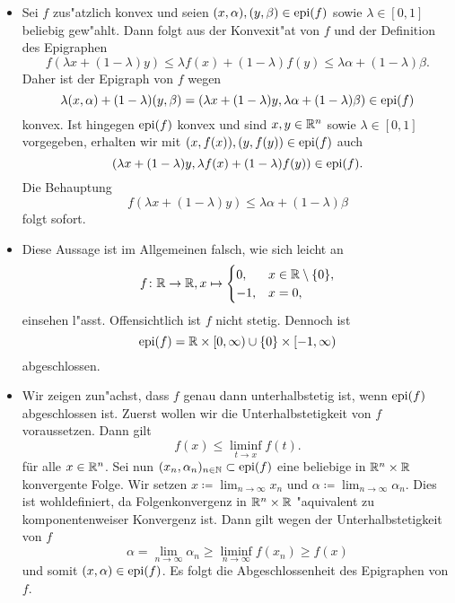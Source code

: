 \begin{itemize}
 \item[(i)] Sei $f$ zus"atzlich konvex und seien $(x,\alpha),(y,\beta)\in\operatorname{epi}(f)$ sowie $\lambda\in[0,1]$ beliebig gew"ahlt.
 Dann folgt aus der Konvexit"at von $f$ und der Definition des Epigraphen
 \begin{displaymath}
  f(\lambda x+(1-\lambda)y)\leq \lambda f(x)+(1-\lambda)f(y)\leq \lambda\alpha+(1-\lambda)\beta.
 \end{displaymath}
 Daher ist der Epigraph von $f$ wegen
 \[
\lambda(x,\alpha)+(1-\lambda)(y,\beta)=
(\lambda x+(1-\lambda)y,\lambda\alpha+(1-\lambda)\beta)\in\operatorname{epi}(f)
 \]
 konvex.
 Ist hingegen $\operatorname{epi}(f)$ konvex und sind $x,y\in\mathbb{R}^n$ sowie $\lambda\in[0,1]$ vorgegeben, erhalten wir mit
 $(x,f(x)),(y,f(y))\in\operatorname{epi}(f)$ auch
\[
 (\lambda x+(1-\lambda)y,\lambda f(x)+(1-\lambda)f(y))\in \operatorname{epi}(f).
 \]
 Die Behauptung
 \begin{displaymath}
  f(\lambda x+(1-\lambda)y)\leq\lambda\alpha+(1-\lambda)\beta
 \end{displaymath}
 folgt sofort.

 \item[(ii)] Diese Aussage ist im Allgemeinen falsch, wie sich leicht an
 \begin{displaymath}
  f\colon\mathbb{R}\to\mathbb{R}, x\mapsto \begin{cases}
                       0, &x\in\mathbb{R}\setminus\{0\},\\
                       -1, &x=0,
                      \end{cases}
 \end{displaymath}
 einsehen l"asst. Offensichtlich ist $f$ nicht stetig. Dennoch ist
 \begin{displaymath}
  \operatorname{epi}(f)=\mathbb{R}\times[0,\infty)\cup\{0\}\times[-1,\infty)
 \end{displaymath}
 abgeschlossen.

 \item[(iii)]
 Wir zeigen zun"achst, dass $f$ genau dann unterhalbstetig ist, wenn $\operatorname{epi}(f)$ abgeschlossen ist.
 Zuerst wollen wir die Unterhalbstetigkeit von $f$ voraussetzen. Dann gilt
 \begin{displaymath}
  f(x)\leq\liminf_{t\to x}f(t).
 \end{displaymath}
 für alle $x\in\mathbb{R}^n$. Sei nun $(x_n,\alpha_n)_{n\in\mathbb{N}}\subset\operatorname{epi}(f)$ eine beliebige in $\mathbb{R}^n\times\mathbb{R}$ konvergente Folge.
 Wir setzen $x\coloneqq \lim_{n\to\infty} x_n$ und $\alpha\coloneqq\lim_{n\to\infty}\alpha_n$.
 Dies ist wohldefiniert, da Folgenkonvergenz in $\mathbb{R}^n\times\mathbb{R}$ "aquivalent zu komponentenweiser Konvergenz ist. Dann gilt
 wegen der Unterhalbstetigkeit von $f$
 \begin{displaymath}
  \alpha= \lim_{n\to\infty}\alpha_n \geq \liminf_{n\to\infty} f(x_n)\geq f(x)
 \end{displaymath}
 und somit $(x,\alpha)\in\operatorname{epi}(f)$. Es folgt die Abgeschlossenheit des Epigraphen von $f$.


\end{itemize}
